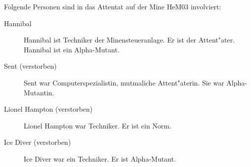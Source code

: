 
Folgende Personen sind in das Attentat auf der Mine HeM03 involviert:

\begin{description}
    \item[Hannibal] Hannibal ist Techniker der Minensteueranlage. Er ist der Attent"ater. Hannibal ist ein Alpha-Mutant.
    \item[Sent (verstorben)] Sent war Computerspezialistin, mutma\3liche Attent"aterin. Sie war Alpha-Mutantin. 
    \item[Lionel Hampton (verstorben)] Lionel Hampton war Techniker. Er ist ein Norm. 
    \item[Ice Diver (verstorben)] Ice Diver war ein Techniker. Er ist Alpha-Mutant. 
\end{description}
